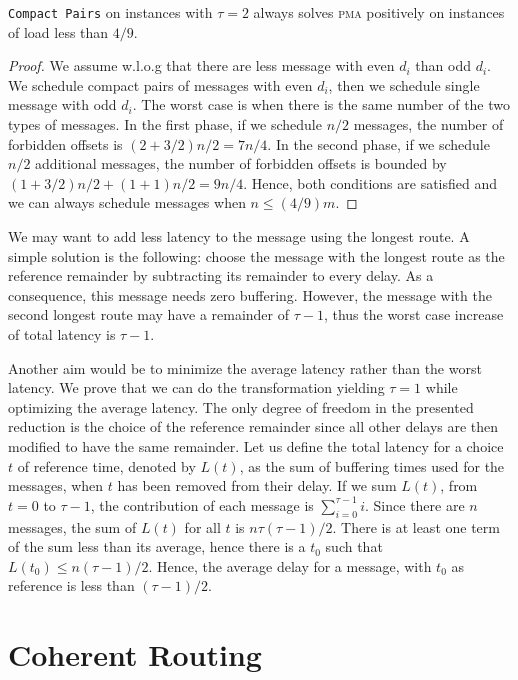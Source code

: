 \documentclass[a4paper,UKenglish,cleveref, autoref, thm-restate]{lipics-v2019}
\newcommand\pma{\textsc{pma}\xspace}
\newcommand\compactpair{\texttt{Compact Pairs}\xspace}
\begin{document}
\begin{theorem}
\compactpair on instances with $\tau =2$ always solves \pma positively on instances of load less than $4/9$.
\end{theorem}
\begin{proof}
We assume w.l.o.g that there are less message with even $d_i$ than odd $d_i$.
We schedule compact pairs of messages with even $d_i$, then we schedule single message with odd $d_i$. The worst case is when there is the same number of the two types of messages. In the first phase, if we schedule
 $n/2$ messages, the number of forbidden offsets is $(2 + 3/2)n/2 = 7n/4$. In the second phase,
 if we schedule $n/2$ additional messages, the number of forbidden offsets is bounded by 
$ (1 + 3/2) n/2  + (1 + 1)n/2 = 9n/4$. Hence, both conditions are satisfied and we can always schedule messages when $n \leq (4/9)m$.
\end{proof}


We may want to add less latency to the message using the longest route. A simple solution is the following: choose the message with the longest route as the reference remainder by subtracting its remainder to every delay. As a consequence, this message needs zero buffering. However, the message with the second longest route may have a remainder of $\tau -1$, thus the worst case increase of total latency is $\tau -1$. 

Another aim would be to minimize the average latency rather than the worst latency.
We prove that we can do the transformation yielding $\tau=1$ while optimizing the average latency. 
 The only degree of freedom in the presented reduction is the choice of the reference remainder since all other delays are then modified to have the same remainder. Let us define the total latency for a choice $t$ of reference time, denoted by $L(t)$, as the sum of buffering times used for the messages, when $t$ has been removed from their delay.
If we sum $L(t)$, from $t=0$ to $\tau-1$, the contribution of each message is $\sum_{i=0}^{\tau-1} i$. Since there are $n$ messages, the sum of $L(t)$ for all $t$ is $n \tau (\tau-1)/2$. There is at least one term of the sum less than its average, hence there is a $t_0$ such that $L(t_0) \leq n (\tau-1)/2$. Hence, the average delay for a message, with $t_0$ as reference is less than $(\tau -1)/2$.

\section{Coherent Routing}\label{sec:coherent}
\end{document}
